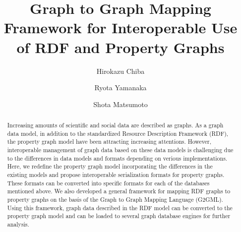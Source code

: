 \documentclass[runningheads]{llncs}
\begin{document}
\newtheorem{defi}[theorem]{Definition}
%
\title{Graph to Graph Mapping Framework for Interoperable Use of RDF and Property Graphs}
%
%
\author{Hirokazu Chiba \and Ryota Yamanaka \and Shota Matsumoto}
%
%
%
\maketitle              %
%
\begin{abstract}
Increasing amounts of scientific and social data are described as graphs. As a graph data model, in addition to the standardized Resource Description Framework (RDF), the property graph model have been attracting increasing attentions.
However, interoperable management of graph data based on these data models is challenging due to the differences in data models and formats depending on verious implementations.
Here, we redefine the property graph model incorporating the differences in the existing models and propose interoperable serialization formats for property graphs. These formats can be converted into specific formats for each of the databases mentioned above. We also developed a general framework for mapping RDF graphs to property graphs on the basis of the Graph to Graph Mapping Language (G2GML).
Using this framework, graph data described in the RDF model can be converted to the property graph model and can be loaded to several graph database engines for further analysis. 

\end{abstract}
\end{document}
